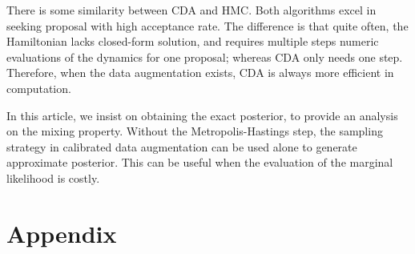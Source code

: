 \documentclass[10pt]{article}
\begin{document}
There is some similarity between CDA and HMC. Both algorithms excel in seeking proposal with high acceptance rate. The difference is that quite often, the Hamiltonian lacks closed-form solution, and requires multiple steps numeric evaluations of the dynamics for one proposal; whereas CDA only needs one step. Therefore, when the data augmentation exists, CDA is always more efficient in computation.

In this article, we insist on obtaining the exact posterior, to provide an analysis on the mixing property. Without the Metropolis-Hastings step, the sampling strategy in calibrated data augmentation can be used alone to generate approximate posterior. This can be useful when the evaluation of the marginal likelihood is costly.





\section{Appendix}
\end{document}
